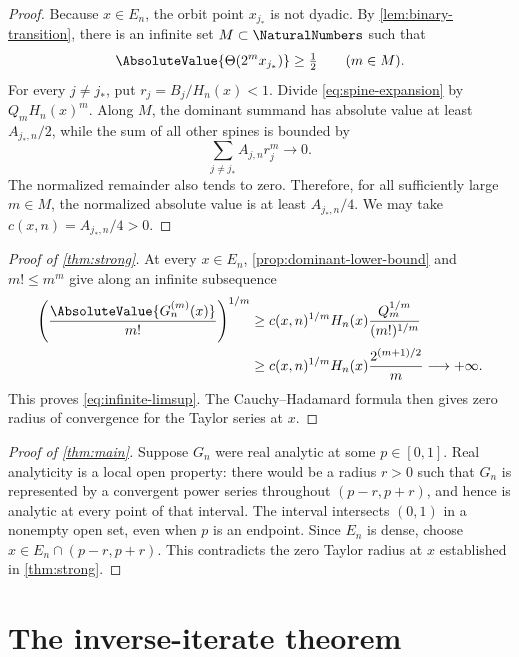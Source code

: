 \documentclass[11pt,oneside]{article}
\theoremstyle{definition}
\theoremstyle{remark}
\newcommand{\ThetaF}{\Theta}
\newcommand{\half}{\tfrac12}
\begin{document}
\begin{proof}
Because $x\in E_n$, the orbit point $x_{j_*}$ is not dyadic.  By
\cref{lem:binary-transition}, there is an infinite set $M\subset\NaturalNumbers$ such that
\begin{equation}
 \AbsoluteValue{\ThetaF(2^m x_{j_*})}\geq\half
 \qquad(m\in M).
 \label{eq:dominant-theta}
\end{equation}
For every $j\neq j_*$, put $r_j=B_j/H_n(x)<1$.  Divide
\eqref{eq:spine-expansion} by $Q_mH_n(x)^m$.  Along $M$, the dominant summand has
absolute value at least $A_{j_*,n}/2$, while the sum of all other spines is bounded by
\[
 \sum_{j\neq j_*}A_{j,n}r_j^m\longrightarrow0.
\]
The normalized remainder also tends to zero.  Therefore, for all sufficiently large
$m\in M$, the normalized absolute value is at least $A_{j_*,n}/4$.  We may take
$c(x,n)=A_{j_*,n}/4>0$.
\end{proof}

\begin{proof}[Proof of \cref{thm:strong}]
At every $x\in E_n$, \cref{prop:dominant-lower-bound} and $m!\leq m^m$ give along an
infinite subsequence
\begin{align}
 \left(\frac{\AbsoluteValue{G_n^{(m)}(x)}}{m!}\right)^{1/m}
 &\geq c(x,n)^{1/m}H_n(x)
   \frac{Q_m^{1/m}}{(m!)^{1/m}}\\
 &\geq c(x,n)^{1/m}H_n(x)\frac{2^{(m+1)/2}}{m}
 \longrightarrow+\infty.
 \label{eq:root-divergence}
\end{align}
This proves \eqref{eq:infinite-limsup}.  The Cauchy--Hadamard formula then gives zero
radius of convergence for the Taylor series at $x$.
\end{proof}

\begin{proof}[Proof of \cref{thm:main}]
Suppose $G_n$ were real analytic at some $p\in[0,1]$.  Real analyticity is a local open
property: there would be a radius $r>0$ such that $G_n$ is represented by a convergent
power series throughout $(p-r,p+r)$, and hence is analytic at every point of that
interval.  The interval intersects $(0,1)$ in a nonempty open set, even when $p$ is an
endpoint.  Since $E_n$ is dense, choose
$x\in E_n\cap(p-r,p+r)$.  This contradicts the zero Taylor radius at $x$ established
in \cref{thm:strong}.
\end{proof}

\section{The inverse-iterate theorem}
\label{sec:inverse-transfer}
\end{document}
